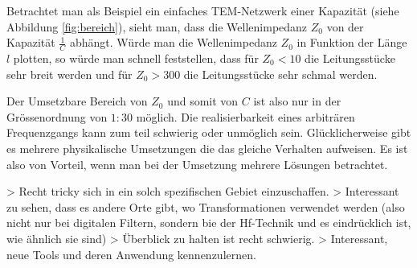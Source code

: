 Betrachtet  man als Beispiel  ein  einfaches  TEM-Netzwerk  einer  Kapazit\"at
(siehe Abbildung \ref{fig:bereich}), sieht man, dass die  Wellenimpedanz $Z_0$
von  der Kapazit\"at $\frac{1}{C}$ abh\"angt. W\"urde man  die  Wellenimpedanz
$Z_0$ in Funktion der L\"ange $l$ plotten, so w\"urde man schnell feststellen,
dass f\"ur $Z_0<10$ die Leitungsst\"ucke sehr breit werden und  f\"ur  $Z_0  >
300$ die Leitungsst\"ucke sehr schmal werden.

Der Umsetzbare Bereich von $Z_0$ und  somit  von  $C$  ist  also  nur  in  der
Gr\"ossenordnung von $1:30$ m\"oglich. Die realisierbarkeit eines arbitr\"aren
Frequenzgangs    kann    zum    teil   schwierig   oder   unm\"oglich    sein.
Gl\"ucklicherweise gibt es  mehrere  physikalische Umsetzungen die das gleiche
Verhalten aufweisen.  Es  ist  also  von  Vorteil,  wenn man bei der Umsetzung
mehrere L\"osungen betrachtet.

> Recht tricky sich in ein solch spezifischen Gebiet einzuschaffen. 
> Interessant zu sehen, dass es andere Orte gibt, wo Transformationen verwendet werden (also nicht nur bei digitalen Filtern, sondern bie der Hf-Technik und es eindrücklich ist, wie ähnlich sie sind)
> Überblick zu halten ist recht schwierig.
> Interessant, neue Tools und deren Anwendung kennenzulernen.

